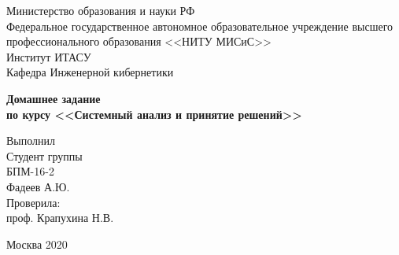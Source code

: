 \documentclass[a4paper,12pt,preview]{report} %
\begin{document}
	
	\begin{center}
		Министерство образования и науки РФ \\
		Федеральное государственное автономное образовательное учреждение высшего профессионального образования <<НИТУ МИСиС>>\\
		Институт ИТАСУ\\
		Кафедра Инженерной кибернетики\\
	\end{center}
	
	
	\vfill
	
	\begin{center}
		\Large\textbf{Домашнее задание  \\
			по курсу <<Системный анализ и принятие решений>>}
	\end{center}
	
	\vfill
	
	\begin{FlushRight}
		Выполнил\\
		Студент группы \\
		БПМ-16-2 \\
		Фадеев А.Ю. \\
		[\baselineskip]
		Проверила: \\
		проф. Крапухина Н.В. \\
		[9\baselineskip]
	\end{FlushRight}
	
	
	\begin{center}
		Москва 2020
	\end{center}
	
	\thispagestyle{empty}
	\newpage
	
	\tableofcontents
	
	
\end{document}
